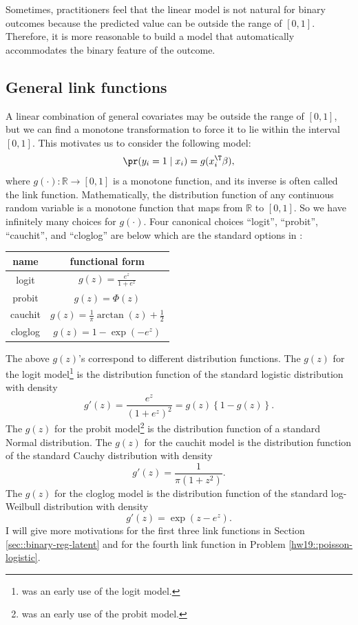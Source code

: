 Sometimes, practitioners feel that the linear model is not natural for binary outcomes because
the predicted value can be outside the range of $[0,1]$. Therefore,
it is more reasonable to build a model that automatically accommodates
the binary feature of the outcome. 


\subsection{General link functions}

A linear combination of general covariates may be outside the range
of $[0,1]$, but we can find a monotone transformation to force it
to lie within the interval $[0,1]$. This motivates us to consider the
following model:
\[
\pr(y_{i}=1\mid x_{i})=g(x_{i}^{\T}\beta),
\]
where $g(\cdot):\mathbb{R}\rightarrow[0,1]$ is a monotone function,
and its inverse is often called the link function. Mathematically,
the distribution function of any continuous random variable is a monotone function that maps from $\mathbb{R}$
to $[0,1]$. So we have infinitely many choices for $g(\cdot)$. Four
canonical choices ``logit'', ``probit'', ``cauchit'', and ``cloglog'' are below which are the standard options in : 

 
\begin{tabular}{|c|c|}
name & functional form\tabularnewline
\hline 
\hline 
logit & $g(z)=\frac{e^{z}}{1+e^{z}}$\tabularnewline
\hline 
probit & $g(z)=\Phi(z)$\tabularnewline
\hline 
cauchit & $g(z)=\frac{1}{\pi}\arctan(z)+\frac{1}{2}$\tabularnewline
\hline 
cloglog & $g(z)=1-\exp(-e^{z})$\tabularnewline
\end{tabular} 
 



The above $g(z)$'s correspond to different distribution functions. The $g(z)$ for the logit model\footnote{\citet{berkson1944application} was an early use of the logit model.}
is the distribution function of the standard logistic distribution
with density
\begin{equation}
g'(z)=\frac{e^{z}}{(1+e^{z})^{2}}=g(z)\left\{ 1-g(z)\right\} . \label{eq:densityoflogit}
\end{equation}
The $g(z)$ for the probit model\footnote{\citet{bliss1934method} was an early use of the probit model.} is the distribution function of a
standard Normal distribution. The $g(z)$ for the cauchit model is
the distribution function of the standard Cauchy distribution with
density
\[
g'(z)=\frac{1}{\pi(1+z^{2})} .
\]
The $g(z)$ for the cloglog model is the distribution function of the standard
log-Weilbull distribution with density
\[
g'(z)=\exp(z-e^{z}).
\]
I will give more motivations for the first three link functions in Section \ref{sec::binary-reg-latent} and for the fourth link function in Problem \ref{hw19::poisson-logistic}. 



